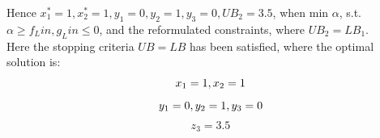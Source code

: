 \documentclass{article}
\begin{document}
Hence $x_{1}^{*} = 1, x_{2}^{*} = 1, y_1 = 0, y_2 = 1, y_3 = 0, UB_2 = 3.5$, when min $\alpha$, s.t. $\alpha \geq f_Lin, g_Lin \leq 0$, and the reformulated constraints, where $UB_2 = LB_1$.\\

Here the stopping criteria $UB = LB$ has been satisfied, where the optimal solution is:
    \begin{equation}\nonumber
        x_1 = 1, x_2 = 1\\
    \end{equation}
    \begin{equation}
        y_1 = 0, y_2 = 1, y_3 = 0\\
    \end{equation}
    \begin{equation}\nonumber
        z_3 = 3.5
    \end{equation}
\\~\\
\end{document}
